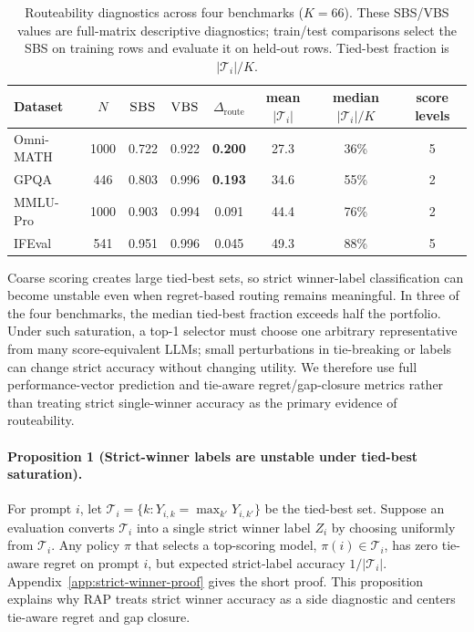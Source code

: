 \documentclass{article}
\newcommand{\sbs}{\textsc{SBS}}
\newcommand{\vbs}{\textsc{VBS}}
\newcommand{\headroom}{\Delta_{\text{route}}}
\newcommand{\tieset}{\mathcal{T}_i}
\begin{document}
\begin{table}[htbp]
  \caption{Routeability diagnostics across four benchmarks ($K{=}66$). These SBS/VBS values are full-matrix descriptive diagnostics; train/test comparisons select the SBS on training rows and evaluate it on held-out rows. Tied-best fraction is $|\tieset|/K$.}
  \label{tab:diagnostics}
  \centering
  \small
  \begin{tabular}{lccccccc}
    \toprule
    Dataset & $N$ & $\sbs$ & $\vbs$ & $\headroom$ & mean $|\tieset|$ & median $|\tieset|/K$ & score levels \\
    \midrule
    Omni-MATH & 1000 & 0.722 & 0.922 & \textbf{0.200} & 27.3 & 36\% & 5 \\
    GPQA      & 446  & 0.803 & 0.996 & \textbf{0.193} & 34.6 & 55\% & 2 \\
    MMLU-Pro  & 1000 & 0.903 & 0.994 & 0.091 & 44.4 & 76\% & 2 \\
    IFEval    & 541  & 0.951 & 0.996 & 0.045 & 49.3 & 88\% & 5 \\
    \bottomrule
  \end{tabular}
\end{table}

Coarse scoring creates large tied-best sets, so strict winner-label classification can become unstable even when regret-based routing remains meaningful. In three of the four benchmarks, the median tied-best fraction exceeds half the portfolio. Under such saturation, a top-1 selector must choose one arbitrary representative from many score-equivalent LLMs; small perturbations in tie-breaking or labels can change strict accuracy without changing utility. We therefore use full performance-vector prediction and tie-aware regret/gap-closure metrics rather than treating strict single-winner accuracy as the primary evidence of routeability.

\paragraph{Proposition 1 (Strict-winner labels are unstable under tied-best saturation).}
For prompt $i$, let $\tieset=\{k:Y_{i,k}=\max_{k'} Y_{i,k'}\}$ be the tied-best set. Suppose an evaluation converts $\tieset$ into a single strict winner label $Z_i$ by choosing uniformly from $\tieset$. Any policy $\pi$ that selects a top-scoring model, $\pi(i)\in \tieset$, has zero tie-aware regret on prompt $i$, but expected strict-label accuracy $1/|\tieset|$. Appendix~\ref{app:strict-winner-proof} gives the short proof. This proposition explains why RAP treats strict winner accuracy as a side diagnostic and centers tie-aware regret and gap closure.
\end{document}
